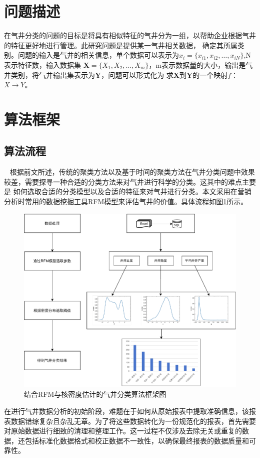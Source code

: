\section{问题描述}
在气井分类的问题的目标是将具有相似特征的气井分为一组，以帮助企业根据气井的特征更好地进行管理。此研究问题是提供某一气井相关数据，
确定其所属类别。问题的输入是气井的相关信息，单个数据可以表示为$x_i = \{x_{i1}, x_{i2}, \ldots, x_{iN}\}$,N表示特征数，输入数据集
$\mathbf{X} = \{X_{1}, X_{2}, \ldots, X_{m}\}$，m表示数据量的大小，输出是气井类别，将气井输出集表示为$\mathbf{Y}$，问题可以形式化为
求$\mathbf{X}$到$\mathbf{Y}$的一个映射$f$：$X \rightarrow Y$。
\section{算法框架}
\subsection{算法流程}\
\label{sec:K-Shapeprocess}
根据前文所述，传统的聚类方法以及基于时间的聚类方法在气井分类问题中效果较差，需要探寻一种合适的分类方法来对气井进行科学的分类。这其中的难点主要是
如何选取合适的分类模型以及合适的特征来对气井进行分类。本文采用在营销分析时常用的数据挖掘工具RFM模型来评估气井的价值。具体流程如图\ref{fig:wellcla}所示。
\begin{figure}
    \centering
    \includegraphics[width=.8\linewidth]{figure/气井分类框架图.pdf}
    \caption{结合RFM与核密度估计的气井分类算法框架图}
    \label{fig:wellcla}
\end{figure}
在进行气井数据分析的初始阶段，难题在于如何从原始报表中提取准确信息，该报表数据错综复杂且杂乱无章。为了将这些数据转化为一份规范化的报表，首先需要对原始数据进行细致的清理和整理工作。这一过程不仅涉及去除无关或重复的数据，还包括标准化数据格式和校正数据不一致性，以确保最终报表的数据质量和可靠性。

